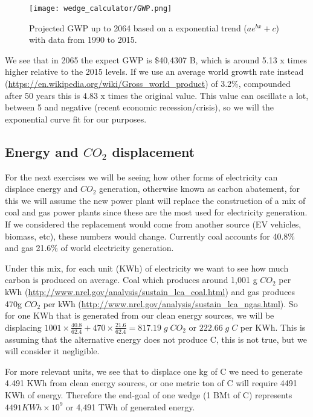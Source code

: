\documentclass[11pt]{article}
\begin{document}
\begin{figure}[htp]
\centering
\texttt{[image: wedge\_calculator/GWP.png]}
\caption{Projected GWP up to 2064 based on a exponential trend ($ae^{bx}+c$) with data from 1990 to 2015.}
\label{}
\end{figure}

We see that in 2065 the expect GWP is \$40,4307 B, which is around 5.13 x times higher relative to the 2015 levels. If we use an average world growth rate instead (\url{https://en.wikipedia.org/wiki/Gross_world_product}) of 3.2\%, compounded after 50 years this is 4.83 x times the original value. This value can oscillate a lot, between 5 and negative (recent economic recession/crisis), so we will the exponential curve fit for our purposes.

\subsection{Energy and $CO_2$ displacement}

For the next exercises we will be seeing how other forms of electricity can displace energy and $CO_2$ generation, otherwise known as carbon abatement, for this we will assume the new power plant will replace the construction of a mix of coal and gas power plants since these are the most used for electricity generation. If we considered the replacement would come from another source (EV vehicles, biomass, etc), these numbers would change. Currently coal accounts for 40.8\% and gas 21.6\%  of world electricity generation.

Under this mix, for each unit (KWh) of electricity we want to see how much carbon is produced on average. Coal which produces around 1,001 g $CO_2$ per kWh (\url{http://www.nrel.gov/analysis/sustain_lca_coal.html}) and gas produces 470g $CO_2$ per kWh (\url{http://www.nrel.gov/analysis/sustain_lca_ngas.html}). So for one KWh that is generated from our clean energy sources, we will be displacing $1001 \times \frac{40.8}{62.4} + 470 \times \frac{21.6}{62.4} = 817.19\;g\;CO_2$ or $222.66\;g\;C$ per KWh. This is assuming that the alternative energy does not produce C, this is not true, but we will consider it negligible.

For more relevant units, we see that to displace one kg of C we need to generate 4.491 KWh from clean energy sources, or one metric ton of C will require 4491 KWh of energy. Therefore the end-goal of one wedge (1 BMt of C) represents $4491 KWh \times 10^9$ or 4,491 TWh of generated energy.
\end{document}
